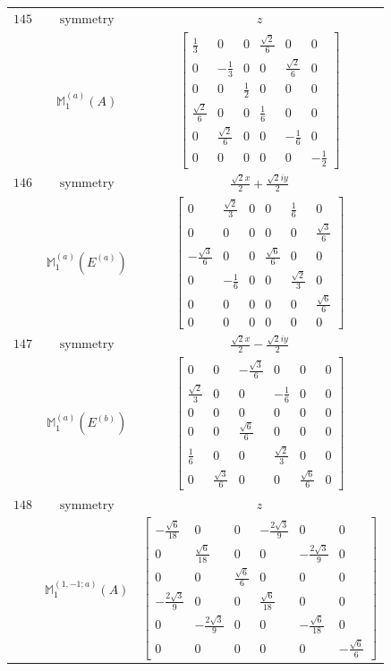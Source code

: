\documentclass[fleqn,8pt,landscape]{jsarticle}
\begin{document}
\begin{longtable}{ccc}
$ 145 $ & $ \text{symmetry} $ & $ z $ \\
$  $ & $ \mathbb{M}_{1}^{(a)}(A) $ & $ \begin{bmatrix} \frac{1}{3} & 0 & 0 & \frac{\sqrt{2}}{6} & 0 & 0 \\ 0 & - \frac{1}{3} & 0 & 0 & \frac{\sqrt{2}}{6} & 0 \\ 0 & 0 & \frac{1}{2} & 0 & 0 & 0 \\ \frac{\sqrt{2}}{6} & 0 & 0 & \frac{1}{6} & 0 & 0 \\ 0 & \frac{\sqrt{2}}{6} & 0 & 0 & - \frac{1}{6} & 0 \\ 0 & 0 & 0 & 0 & 0 & - \frac{1}{2} \end{bmatrix} $ \\ \hline
$ 146 $ & $ \text{symmetry} $ & $ \frac{\sqrt{2} x}{2} + \frac{\sqrt{2} i y}{2} $ \\
$  $ & $ \mathbb{M}_{1}^{(a)}(E^{(a)}) $ & $ \begin{bmatrix} 0 & \frac{\sqrt{2}}{3} & 0 & 0 & \frac{1}{6} & 0 \\ 0 & 0 & 0 & 0 & 0 & \frac{\sqrt{3}}{6} \\ - \frac{\sqrt{3}}{6} & 0 & 0 & \frac{\sqrt{6}}{6} & 0 & 0 \\ 0 & - \frac{1}{6} & 0 & 0 & \frac{\sqrt{2}}{3} & 0 \\ 0 & 0 & 0 & 0 & 0 & \frac{\sqrt{6}}{6} \\ 0 & 0 & 0 & 0 & 0 & 0 \end{bmatrix} $ \\ \hline
$ 147 $ & $ \text{symmetry} $ & $ \frac{\sqrt{2} x}{2} - \frac{\sqrt{2} i y}{2} $ \\
$  $ & $ \mathbb{M}_{1}^{(a)}(E^{(b)}) $ & $ \begin{bmatrix} 0 & 0 & - \frac{\sqrt{3}}{6} & 0 & 0 & 0 \\ \frac{\sqrt{2}}{3} & 0 & 0 & - \frac{1}{6} & 0 & 0 \\ 0 & 0 & 0 & 0 & 0 & 0 \\ 0 & 0 & \frac{\sqrt{6}}{6} & 0 & 0 & 0 \\ \frac{1}{6} & 0 & 0 & \frac{\sqrt{2}}{3} & 0 & 0 \\ 0 & \frac{\sqrt{3}}{6} & 0 & 0 & \frac{\sqrt{6}}{6} & 0 \end{bmatrix} $ \\ \hline
$ 148 $ & $ \text{symmetry} $ & $ z $ \\
$  $ & $ \mathbb{M}_{1}^{(1,-1;a)}(A) $ & $ \begin{bmatrix} - \frac{\sqrt{6}}{18} & 0 & 0 & - \frac{2 \sqrt{3}}{9} & 0 & 0 \\ 0 & \frac{\sqrt{6}}{18} & 0 & 0 & - \frac{2 \sqrt{3}}{9} & 0 \\ 0 & 0 & \frac{\sqrt{6}}{6} & 0 & 0 & 0 \\ - \frac{2 \sqrt{3}}{9} & 0 & 0 & \frac{\sqrt{6}}{18} & 0 & 0 \\ 0 & - \frac{2 \sqrt{3}}{9} & 0 & 0 & - \frac{\sqrt{6}}{18} & 0 \\ 0 & 0 & 0 & 0 & 0 & - \frac{\sqrt{6}}{6} \end{bmatrix} $ \\ \hline

\end{longtable}
\end{document}
